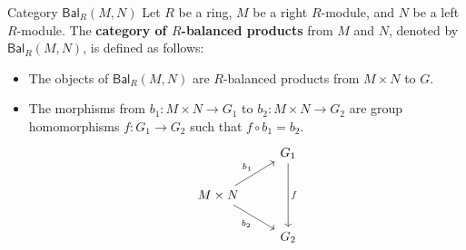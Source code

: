 \begin{definition}{Category $\mathsf{Bal}_R(M,N)$}{}
    Let $R$ be a ring, $M$ be a right $R$-module, and $N$ be a left $R$-module. The \textbf{category of $R$-balanced products} from $M$ and $N$, denoted by $\mathsf{Bal}_R(M, N)$, is defined as follows:
    \begin{itemize}
        \item The objects of $\mathsf{Bal}_R(M, N)$ are $R$-balanced products from $M\times N$ to $G$.
        \item The morphisms from $b_1:M\times N\to G_1$ to $b_2:M\times N\to G_2$ are group homomorphisms $f:G_1\to G_2$ such that $f\circ b_1=b_2$.
        \[
            \begin{tikzcd}[ampersand replacement=\&]
                \& G_1 \arrow[dd, "f"] \\
M\times N \arrow[ru, "b_1"] \arrow[rd, "b_2"'] \&                   \\
                \& G_2                
\end{tikzcd}
        \]
    \end{itemize}
\end{definition}

